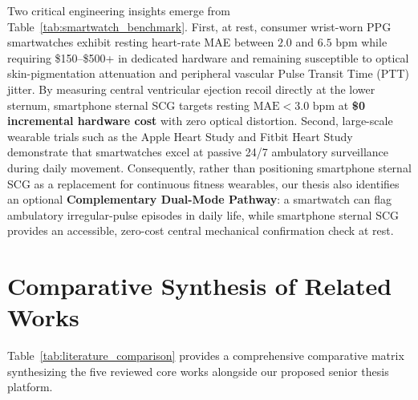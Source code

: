 Two critical engineering insights emerge from Table~\ref{tab:smartwatch_benchmark}. First, at rest, consumer wrist-worn PPG smartwatches exhibit resting heart-rate MAE between $2.0$ and $6.5\text{ bpm}$ \cite{bent2020investigating, nelson2019accuracy} while requiring \$150--\$500+ in dedicated hardware and remaining susceptible to optical skin-pigmentation attenuation and peripheral vascular Pulse Transit Time (PTT) jitter. By measuring central ventricular ejection recoil directly at the lower sternum, smartphone sternal SCG targets resting $\text{MAE} < 3.0\text{ bpm}$ at \textbf{\$0 incremental hardware cost} with zero optical distortion. Second, large-scale wearable trials such as the Apple Heart Study \cite{perez2019large} and Fitbit Heart Study \cite{lubitz2022detection} demonstrate that smartwatches excel at passive 24/7 ambulatory surveillance during daily movement. Consequently, rather than positioning smartphone sternal SCG as a replacement for continuous fitness wearables, our thesis also identifies an optional \textbf{Complementary Dual-Mode Pathway}: a smartwatch can flag ambulatory irregular-pulse episodes in daily life, while smartphone sternal SCG provides an accessible, zero-cost central mechanical confirmation check at rest.

\newpage
\section{Comparative Synthesis of Related Works}

Table~\ref{tab:literature_comparison} provides a comprehensive comparative matrix synthesizing the five reviewed core works alongside our proposed senior thesis platform.

